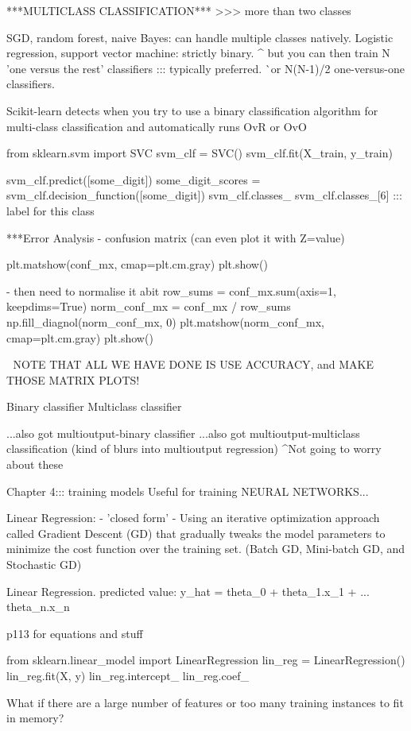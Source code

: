 ***MULTICLASS CLASSIFICATION***
>>> more than two classes

SGD, random forest, naive Bayes: can handle multiple classes natively.
Logistic regression, support vector machine: strictly binary.
^ but you can then train N 'one versus the rest' classifiers ::: typically preferred.
^^ or N(N-1)/2 one-versus-one classifiers. 

Scikit-learn detects when you try to use a binary classification algorithm for multi-class classification
and automatically runs OvR or OvO

from sklearn.svm import SVC
svm_clf = SVC()
svm_clf.fit(X_train, y_train)

svm_clf.predict([some_digit])
some_digit_scores = svm_clf.decision_function([some_digit])
svm_clf.classes_
svm_clf.classes_[6] ::: label for this class

***Error Analysis
- confusion matrix (can even plot it with Z=value)

plt.matshow(conf_mx, cmap=plt.cm.gray)
plt.show()

- then need to normalise it abit
row_sums = conf_mx.sum(axis=1, keepdims=True)
norm_conf_mx = conf_mx / row_sums
np.fill_diagnol(norm_conf_mx, 0)
plt.matshow(norm_conf_mx, cmap=plt.cm.gray)
plt.show()

^^^
NOTE THAT ALL WE HAVE DONE IS USE ACCURACY, and MAKE THOSE MATRIX PLOTS!

Binary classifier
Multiclass classifier

...also got multioutput-binary classifier
...also got multioutput-multiclass classification (kind of blurs into multioutput regression)
^Not going to worry about these


Chapter 4::: training models
Useful for training NEURAL NETWORKS...

Linear Regression:
- 'closed form'
-
Using an iterative optimization approach called Gradient Descent (GD)
that gradually tweaks the model parameters to minimize the cost function over the training set.
(Batch GD, Mini-batch GD, and Stochastic GD)

Linear Regression.
predicted value: y_hat = theta_0 + theta_1.x_1 + ... theta_n.x_n

p113 for equations and stuff

from sklearn.linear_model import LinearRegression
lin_reg = LinearRegression()
lin_reg.fit(X, y)
lin_reg.intercept_
lin_reg.coef_

What if there are a large number of features
or too many training instances to fit in memory?

